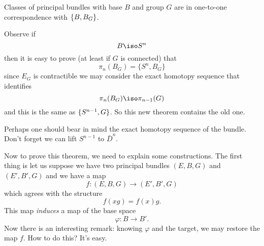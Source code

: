 \begin{thm}
Classes of principal bundles with base $B$ and group $G$ are in
one-to-one correspondence with $\homotopyClass(B,B_{G})$.
\end{thm}

Observe if
\begin{equation}
B\iso S^{n}
\end{equation}
then it is easy to prove (at least if $G$ is connected) that
\begin{equation}
\pi_{n}(B_{G})=\{S^{n},B_{G}\}
\end{equation}
since $E_{G}$ is contractible we may consider the exact homotopy
sequence that identifies
\begin{equation}
\pi_{n}(B_{G})\iso\pi_{n-1}(G)
\end{equation}
and this is the same as $\homotopyClass(S^{n-1},G)$. So this new theorem
contains the old one.

\begin{rmk}
Perhaps one should bear in mind the exact homotopy sequence of
the bundle. Don't forget we can lift $S^{n-1}$ to $\bar{D}^{n}$.
\end{rmk}

Now to prove this theorem, we need to explain some
constructions. The first thing is let us suppose we have two
principal bundles $(E,B,G)$ and $(E',B',G)$ and we have a map
\begin{equation}
f\colon (E,B,G)\to(E',B',G)
\end{equation}
which agrees with the structure
\begin{equation}
f(xg)=f(x)g.
\end{equation}
This map \emph{induces} a map of the base space
\begin{equation}
\varphi\colon B\to B'.
\end{equation}
Now there is an interesting remark: knowing $\varphi$ and the
target, we may restore the map $f$. How to do this? It's easy.

